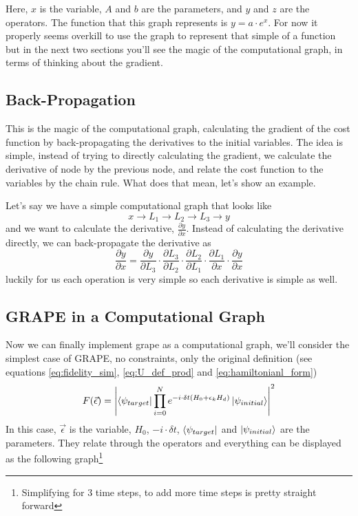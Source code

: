 Here, $x$ is the variable, $A$ and $b$ are the parameters, and $y$ and $z$ are the operators. The function that this graph represents is $y = a \cdot e^{x}$. For now it properly seems overkill to use the graph to represent that simple of a function but in the next two sections you'll see the magic of the computational graph, in terms of thinking about the gradient.

\subsection{Back-Propagation}
This is the magic of the computational graph, calculating the gradient of the cost function by back-propagating the derivatives to the initial variables. The idea is simple, instead of trying to directly calculating the gradient, we calculate the derivative of node by the previous node, and relate the cost function to the variables by the chain rule. What does that mean, let's show an example.

Let's say we have a simple computational graph that looks like
\[x \rightarrow L_1 \rightarrow L_2 \rightarrow L_3 \rightarrow y\] 
and we want to calculate the derivative, $\frac{\partial y}{\partial x}$. Instead of calculating the derivative directly, we can back-propagate the derivative as
\[\frac{\partial y}{\partial x} = \frac{\partial y}{\partial L_3} \cdot \frac{\partial L_3}{\partial L_2} \cdot \frac{\partial L_2}{\partial L_1} \cdot \frac{\partial L_1}{\partial x} \cdot \frac{\partial y}{\partial x}\]
luckily for us each operation is very simple so each derivative is simple as well.

\subsection{GRAPE in a Computational Graph}
Now we can finally implement grape as a computational graph, we'll consider the simplest case of GRAPE, no constraints, only the original definition (see equations \ref{eq:fidelity_sim}, \ref{eq:U_def_prod} and \ref{eq:hamiltonianl_form})%
\[
    F (\vec{\epsilon}) = \abs{\bra{\psi_{target}} \prod_{i=0}^N e^{-i \cdot \delta t  (H_0 + \epsilon_k H_d)} \ket{\psi_{initial}}}^2
\]
In this case, $\vec{\epsilon}$ is the variable, $H_0$, $-i \cdot \delta t$, $\bra{\psi_{target}}$ and $\ket{\psi_{initial}}$ are the parameters. They relate through the operators and everything can be displayed as the following graph\footnote{Simplifying for 3 time steps, to add more time steps is pretty straight forward}

